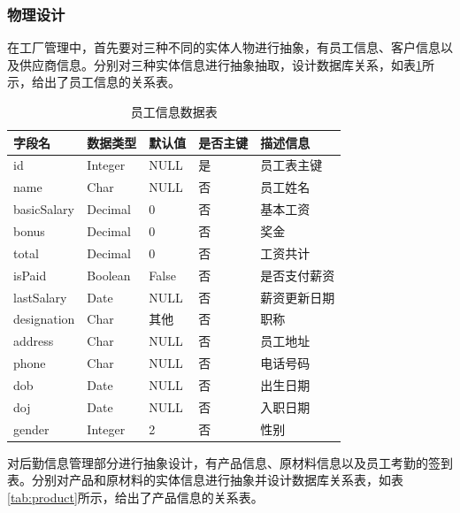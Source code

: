 \subsubsection{物理设计}

在工厂管理中，首先要对三种不同的实体人物进行抽象，有员工信息、客户信息以及供应商信息。分别对三种实体信息进行抽象抽取，设计数据库关系，如表\ref{tab:emp}所示，给出了员工信息的关系表。

\begin{table}[H]
    \centering
    \caption{员工信息数据表}
    \label{tab:emp}
    \begin{tabularx}{.95\textwidth}{X<{\centering}X<{\centering}X<{\centering}X<{\centering}X<{\centering}}
        \toprule
        字段名 & 数据类型 & 默认值 & 是否主键 & 描述信息 \\
        \midrule
        id & Integer & NULL & 是 & 员工表主键 \\
        name & Char & NULL & 否 & 员工姓名 \\
        basicSalary & Decimal & 0 & 否 & 基本工资 \\
        bonus & Decimal & 0 & 否 & 奖金 \\
        total & Decimal & 0 & 否 & 工资共计 \\
        isPaid & Boolean & False & 否 & 是否支付薪资 \\
        lastSalary & Date & NULL & 否 & 薪资更新日期 \\
        designation & Char & 其他 & 否 & 职称 \\
        address & Char & NULL & 否 & 员工地址 \\
        phone & Char & NULL & 否 & 电话号码 \\
        dob & Date & NULL & 否 & 出生日期 \\
        doj & Date & NULL & 否 & 入职日期 \\
        gender & Integer & 2 & 否 & 性别 \\
        \bottomrule
    \end{tabularx}
\end{table}

对后勤信息管理部分进行抽象设计，有产品信息、原材料信息以及员工考勤的签到表。分别对产品和原材料的实体信息进行抽象并设计数据库关系表，如表\ref{tab:product}所示，给出了产品信息的关系表。

